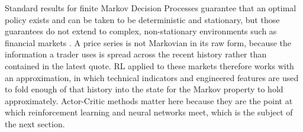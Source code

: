 

Standard results for finite Markov Decision Processes guarantee that an optimal policy exists and can be taken to be deterministic and stationary, but those guarantees do not extend to complex, non-stationary environments such as financial markets \cite{sutton_reinforcement_2018}. A price series is not Markovian in its raw form, because the information a trader uses is spread across the recent history rather than contained in the latest quote. RL applied to these markets therefore works with an approximation, in which technical indicators and engineered features are used to fold enough of that history into the state for the Markov property to hold approximately. Actor-Critic methods matter here because they are the point at which reinforcement learning and neural networks meet, which is the subject of the next section.
